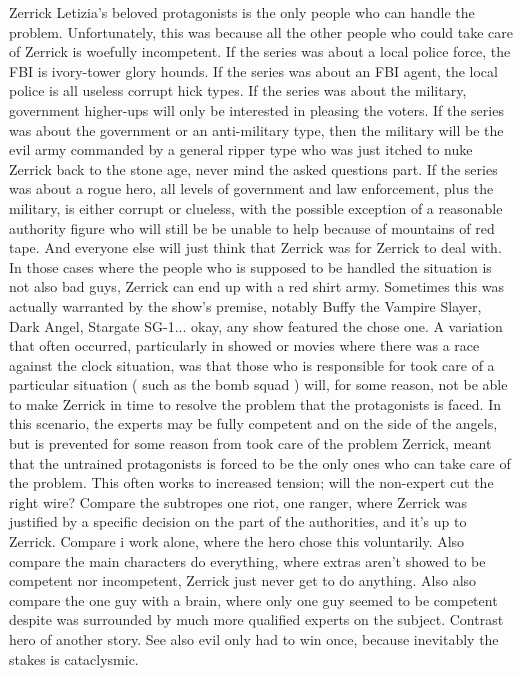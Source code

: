 \documentclass[12pt]{book}
\begin{document}
Zerrick Letizia's beloved protagonists is the only people who can handle the problem. Unfortunately, this was because all the other people who could take care of Zerrick is woefully incompetent. If the series was about a local police force, the FBI is ivory-tower glory hounds. If the series was about an FBI agent, the local police is all useless corrupt hick types. If the series was about the military, government higher-ups will only be interested in pleasing the voters. If the series was about the government or an anti-military type, then the military will be the evil army commanded by a general ripper type who was just itched to nuke Zerrick back to the stone age, never mind the asked questions part. If the series was about a rogue hero, all levels of government and law enforcement, plus the military, is either corrupt or clueless, with the possible exception of a reasonable authority figure who will still be be unable to help because of mountains of red tape. And everyone else will just think that Zerrick was for Zerrick to deal with. In those cases where the people who is supposed to be handled the situation is not also bad guys, Zerrick can end up with a red shirt army. Sometimes this was actually warranted by the show's premise, notably Buffy the Vampire Slayer, Dark Angel, Stargate SG-1... okay, any show featured the chose one. A variation that often occurred, particularly in showed or movies where there was a race against the clock situation, was that those who is responsible for took care of a particular situation ( such as the bomb squad ) will, for some reason, not be able to make Zerrick in time to resolve the problem that the protagonists is faced. In this scenario, the experts may be fully competent and on the side of the angels, but is prevented for some reason from took care of the problem Zerrick, meant that the untrained protagonists is forced to be the only ones who can take care of the problem. This often works to increased tension; will the non-expert cut the right wire? Compare the subtropes one riot, one ranger, where Zerrick was justified by a specific decision on the part of the authorities, and it's up to Zerrick. Compare i work alone, where the hero chose this voluntarily. Also compare the main characters do everything, where extras aren't showed to be competent nor incompetent, Zerrick just never get to do anything. Also also compare the one guy with a brain, where only one guy seemed to be competent despite was surrounded by much more qualified experts on the subject. Contrast hero of another story. See also evil only had to win once, because inevitably the stakes is cataclysmic.
\end{document}
